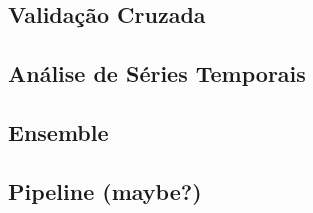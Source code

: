 \subsection{Validação Cruzada}
\lipsum[1-7]

\subsection{Análise de Séries Temporais}
\lipsum[1-7]

\subsection{Ensemble}
\lipsum[1-7]

\subsection{Pipeline (maybe?)}
\lipsum[1-7]